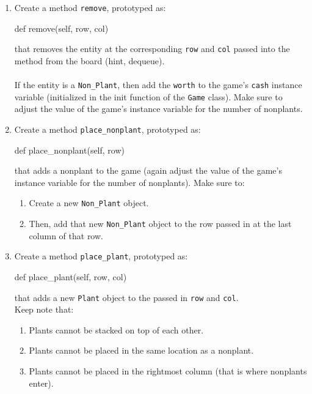 \documentclass{42-en}
\begin{document}
\makeheaderfiles
        \begin{enumerate}\itemsep7pt
    \item Create a method \texttt{remove}, prototyped as:
\begin{42pycode}
def remove(self, row, col)
\end{42pycode}
    that removes the entity at the corresponding \texttt{row} and \texttt{col} passed into the method from the board (hint, dequeue).
    \\\\
    If the entity is a \texttt{Non\_Plant}, then add the \texttt{worth} to the game's \texttt{cash} instance variable (initialized in the init function of the \texttt{Game} class).
    Make sure to adjust the value of the game's instance variable for the number of nonplants.
    \item Create a method \texttt{place\_nonplant}, prototyped as:
\begin{42pycode}
def place_nonplant(self, row)
\end{42pycode}
that adds a nonplant to the game (again adjust the value of the game's instance variable for the number of nonplants). 
Make sure to:
   \begin{enumerate}\itemsep7pt
        \item Create a new \texttt{Non\_Plant} object.
        \item Then, add that new \texttt{Non\_Plant} object to the row passed in at the last column of that row.
    \end{enumerate}
    \newpage
    \item Create a method \texttt{place\_plant}, prototyped as:
\begin{42pycode}
def place_plant(self, row, col)
\end{42pycode}
 that adds a new \texttt{Plant} object to the passed in \texttt{row} and \texttt{col}.
 \\
 Keep note that:
 \begin{enumerate}\itemsep7pt
     \item Plants cannot be stacked on top of each other.
    \item Plants cannot be placed in the same location as a nonplant.
    \item Plants cannot be placed in the rightmost column (that is where nonplants enter).
    \end{enumerate}

\end{enumerate}
\end{document}
